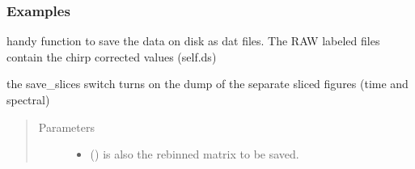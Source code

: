 \documentclass[letterpaper,10pt,english]{sphinxmanual}
\begin{document}
\begin{fulllineitems}
\begin{fulllineitems}
\begin{quote}
\begin{description}
\begin{itemize}
\end{itemize}

\end{description}\end{quote}
\subsubsection*{Examples}

\begin{sphinxVerbatim}[commandchars=\\\{\}]
  
\end{sphinxVerbatim}

\end{fulllineitems}


\begin{fulllineitems}
\label{\detokenize{plot_func:plot_func.TA.Save_data}}
handy function to save the data on disk as dat files.
The RAW labeled files contain the chirp corrected values (self.ds)

the save\_slices switch turns on the dump of the separate sliced figures (time and spectral)
\begin{quote}\begin{description}
\item[{Parameters}] \leavevmode\begin{itemize}
\item {} 
 (\sphinxstyleliteralemphasis{\sphinxupquote{, }}) \textendash{} is also the re\sphinxhyphen{}binned matrix to be saved.


\end{itemize}
\end{description}
\end{quote}
\end{fulllineitems}
\end{fulllineitems}
\end{document}
